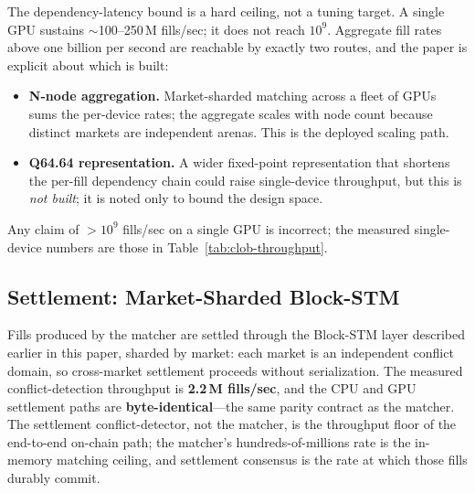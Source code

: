 The dependency-latency bound is a hard ceiling, not a tuning target. A
single GPU sustains $\sim$100--250\,M fills/sec; it does not reach
$10^9$. Aggregate fill rates above one billion per second are reachable
by exactly two routes, and the paper is explicit about which is built:

\begin{itemize}
  \item \textbf{N-node aggregation.} Market-sharded matching across a
    fleet of GPUs sums the per-device rates; the aggregate scales with
    node count because distinct markets are independent arenas. This is
    the deployed scaling path.
  \item \textbf{Q64.64 representation.} A wider fixed-point
    representation that shortens the per-fill dependency chain could
    raise single-device throughput, but this is \emph{not built}; it is
    noted only to bound the design space.
\end{itemize}

Any claim of $>$$10^9$ fills/sec on a single GPU is incorrect; the
measured single-device numbers are those in
Table~\ref{tab:clob-throughput}.

\subsection{Settlement: Market-Sharded Block-STM}

Fills produced by the matcher are settled through the Block-STM layer
described earlier in this paper, sharded by market: each market is an
independent conflict domain, so cross-market settlement proceeds
without serialization. The measured conflict-detection throughput is
\textbf{2.2\,M fills/sec}, and the CPU and GPU settlement paths are
\textbf{byte-identical}---the same parity contract as the matcher. The
settlement conflict-detector, not the matcher, is the throughput floor
of the end-to-end on-chain path; the matcher's hundreds-of-millions rate
is the in-memory matching ceiling, and settlement consensus is the rate
at which those fills durably commit.

